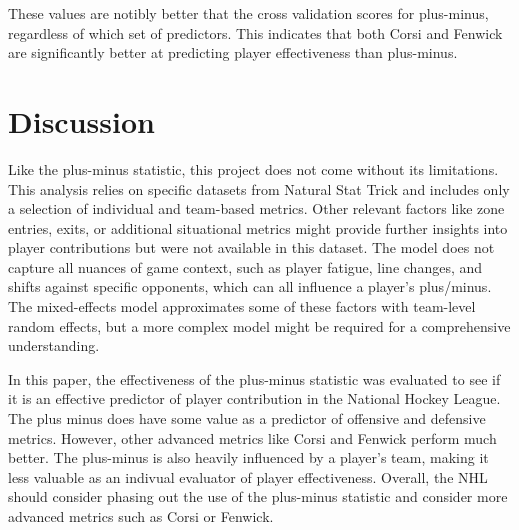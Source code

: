 \documentclass[12pt]{article}
\begin{document}
These values are notibly better that the cross validation scores for plus-minus, regardless of which set of predictors. This indicates
that both Corsi and Fenwick are significantly better at predicting player effectiveness than plus-minus.


\section{Discussion}
\label{sec:disc}

Like the plus-minus statistic, this project does not come without its limitations. This analysis relies on specific datasets from 
Natural Stat Trick and includes only a selection of individual and team-based metrics. Other relevant factors like zone entries, exits, or 
additional situational metrics might provide further insights into player contributions but were not available in this dataset. The model 
does not capture all nuances of game context, such as player fatigue, line changes, and shifts against specific opponents, which can all 
influence a player’s plus/minus. The mixed-effects model approximates some of these factors with team-level random effects, but a more 
complex model might be required for a comprehensive understanding.

In this paper, the effectiveness of the plus-minus statistic was evaluated to see if it is an effective predictor of player contribution
in the National Hockey League. The plus minus does have some value as a predictor of offensive and defensive metrics. However, other
advanced metrics like Corsi and Fenwick perform much better. The plus-minus is also heavily influenced by a player's team, making it 
less valuable as an indivual evaluator of player effectiveness. Overall, the NHL should consider phasing out the use of the plus-minus
statistic and consider more advanced metrics such as Corsi or Fenwick.




\end{document}

